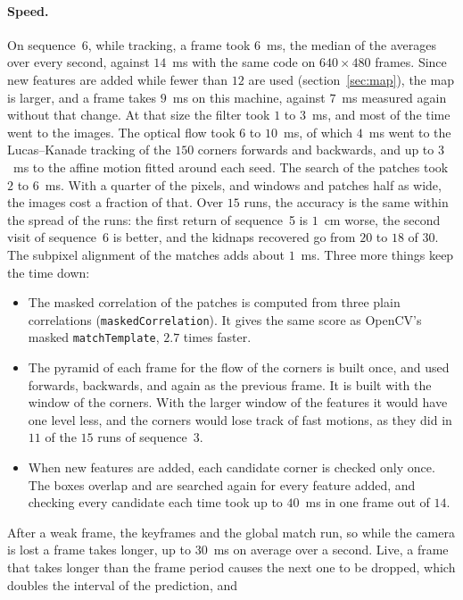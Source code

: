 \documentclass[11pt]{article}
\begin{document}
\paragraph{Speed.}
On sequence~6, while tracking, a frame took $6$~ms, the median of the averages over every second,
against $14$~ms with the same code on $640 \times 480$ frames. Since new features are added while
fewer than $12$ are used (section~\ref{sec:map}), the map is larger, and a frame takes $9$~ms on
this machine, against $7$~ms measured again without that change. At that size the filter took $1$ to
$3$~ms, and most of the time went to the images. The optical flow took $6$ to $10$~ms, of which
$4$~ms went to the Lucas--Kanade tracking of the $150$ corners forwards and backwards, and up to
$3$~ms to the affine motion fitted around each seed. The search of the patches took $2$ to $6$~ms.
With a quarter of the pixels, and windows and patches half as wide, the images cost a fraction of
that. Over $15$ runs, the accuracy is the same within the spread of the runs: the first return of
sequence~5 is $1$~cm worse, the second visit of sequence~6 is better, and the kidnaps recovered go
from $20$ to $18$ of $30$. The subpixel alignment of the matches adds about $1$~ms. Three more
things keep the time down:
\begin{itemize}
  \item The masked correlation of the patches is computed from three plain correlations
        (\texttt{maskedCorrelation}). It gives the same score as OpenCV's masked
        \texttt{matchTemplate}, $2.7$ times faster.
  \item The pyramid of each frame for the flow of the corners is built once, and used forwards,
        backwards, and again as the previous frame. It is built with the window of the corners. With the larger window of the features it would
        have one level less, and the corners would
        lose track of fast motions, as they did in $11$ of the $15$ runs of sequence~3.
  \item When new features are added, each candidate corner is checked only once. The boxes overlap
        and are searched again for every feature added, and checking every candidate each time took
        up to $40$~ms in one frame out of $14$.
\end{itemize}
After a weak frame, the keyframes and the global match run, so while the camera is lost a frame
takes longer, up to $30$~ms on average over a second. Live, a frame that takes longer than the
frame period causes the next one to be dropped, which doubles the interval of the prediction, and
\end{document}
